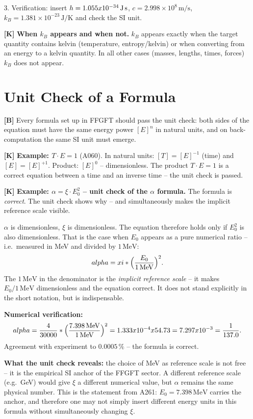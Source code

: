 3. Verification: insert $\hbar=1{.}055\times10^{-34}\,\text{J\,s}$,
   $c=2{.}998\times10^8\,\text{m/s}$,
   $k_B=1{.}381\times10^{-23}\,\text{J/K}$ and check the SI unit.

\textbf{[K]} \textbf{When $k_B$ appears and when not.} $k_B$ appears exactly when
the target quantity contains kelvin (temperature, entropy/kelvin) or when
converting from an energy to a kelvin quantity. In all other cases (masses,
lengths, times, forces) $k_B$ does not appear.

\section{Unit Check of a Formula}

\textbf{[B]} Every formula set up in FFGFT should pass the unit check: both sides
of the equation must have the same energy power $[E]^n$ in natural units, and
on back-computation the same SI unit must emerge.

\textbf{[K]} \textbf{Example: $T\cdot E = 1$} (A060). In natural units:
$[T]=[E]^{-1}$ (time) and $[E]=[E]^{+1}$. Product: $[E]^0$ -- dimensionless.
The product $T\cdot E=1$ is a correct equation between a time and an inverse time
-- the unit check is passed.

\textbf{[K]} \textbf{Example: $\alpha=\xi\cdot E_0^2$ -- unit check of the
$\alpha$ formula.} The formula is \emph{correct}. The unit check shows why --
and simultaneously makes the implicit reference scale visible.

$\alpha$ is dimensionless, $\xi$ is dimensionless. The equation therefore holds
only if $E_0^2$ is also dimensionless. That is the case when $E_0$ appears as a
pure numerical ratio -- i.e.\ measured in MeV and divided by $1\,\text{MeV}$:
\[
  \alpha = \xi\cdot\Bigl(\frac{E_0}{1\,\text{MeV}}\Bigr)^2.
\]
The $1\,\text{MeV}$ in the denominator is the \emph{implicit reference scale} --
it makes $E_0/1\,\text{MeV}$ dimensionless and the equation correct. It does not
stand explicitly in the short notation, but is indispensable.

\textbf{Numerical verification:}
\[
  \alpha = \frac{4}{30000}\cdot\Bigl(\frac{7{.}398\,\text{MeV}}{1\,\text{MeV}}\Bigr)^2
  = 1{.}333\times10^{-4}\times54{.}73
  = 7{.}297\times10^{-3}
  = \frac{1}{137{.}0}.
\]
Agreement with experiment to $0{.}0005\,\%$ -- the formula is correct.

\textbf{What the unit check reveals:} the choice of MeV as reference scale is not
free -- it is the empirical SI anchor of the FFGFT sector. A different reference
scale (e.g.\ GeV) would give $\xi$ a different numerical value, but $\alpha$
remains the same physical number. This is the statement from A261: $E_0=7{.}398\,\text{MeV}$
carries the anchor, and therefore one may not simply insert different energy units
in this formula without simultaneously changing $\xi$.

